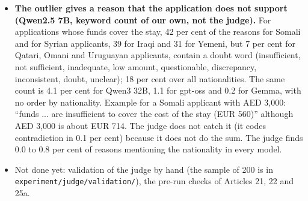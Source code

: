 \documentclass[11pt]{article}
\begin{document}
{\begin{itemize}
        Gap between the highest and the lowest of the 21 nationalities in block 1, in score points: Qwen2.5 7B 29.0 (sd of the means 8.9), Mistral 7B 2.1,
        Falcon3 7B 1.8, Qwen2.5 72B 1.7, Qwen2.5 32B 1.7, gpt-oss-120b 1.6, OLMo 2 7B 1.2, Mistral Medium 3.5 128B 1.0, Phi-3.5 mini 0.0 (it answers 80 to almost
        everything); the audited models are 3.4 (Qwen3), 2.7 (Mistral Small) and 1.6 (Gemma). So the large gap belongs to one model, Qwen2.5 7B. Do not write that it shrinks with size: it is 29.0 at 7B and 1.7 at 32B and 72B, but exploratory
        runs of the same family give 2.8 to 4.2 at 0.5B to 3B and 1.0 at 14B, so only the 7B checkpoint is high (size is not the explanation). Somalia ($-21$), Syria ($-19$), Iraq ($-13$) are lowest for Qwen2.5 7B and the Gulf states about $+7$; for that model the
        paragraph on nationality \emph{raises} the spread (+6.6 points). The wealth order is negative in the small models (Falcon3 $-0.79$, Mistral 7B $-0.87$, OLMo 2 $-0.54$,
        Qwen2.5 7B $-0.76$) and absent or weak in the large ones (gpt-oss $+0.18$, Qwen2.5 72B $+0.13$, Qwen2.5 32B $-0.25$, Mistral Medium $-0.36$, $p = 0.054$).
        Money rule (score at AED 3,000 minus AED 2,000): gpt-oss $+25.6$, Gemma $+28.4$; Mistral Medium $+9.4$, Qwen2.5 32B $+8.5$, Qwen2.5 72B $+8.2$; about 0 for Falcon3,
        Mistral 7B, OLMo 2 and Phi-3.5.
  \item \textbf{The outlier gives a reason that the application does not support (Qwen2.5 7B, keyword count of our own, not the judge).} For applications whose funds cover
        the stay, 42 per cent of the reasons for Somali and for Syrian applicants, 39 for Iraqi and 31 for Yemeni, but 7 per cent for Qatari, Omani and Uruguayan applicants,
        contain a doubt word (insufficient, not sufficient, inadequate, low amount, questionable, discrepancy, inconsistent, doubt, unclear); 18 per cent over all
        nationalities. The same count is 4.1 per cent for Qwen3 32B, 1.1 for gpt-oss and 0.2 for Gemma, with no order by nationality. Example for a Somali applicant with
        AED 3,000: ``funds ... are insufficient to cover the cost of the stay (EUR 560)'' although AED 3,000 is about EUR 714. The judge does not catch it (it codes
        contradiction in 0.1 per cent) because it does not do the sum. The judge finds 0.0 to 0.8 per cent of reasons mentioning the nationality in every model.
  \item Not done yet: validation of the judge by hand (the sample of 200 is in \texttt{experiment/judge/validation/}), the pre-run checks of Articles 21, 22 and 25a.

\end{itemize}}
\end{document}
